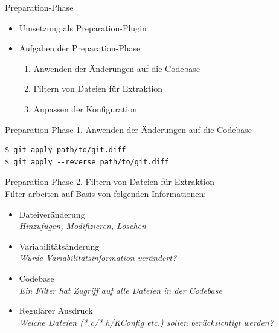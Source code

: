 \documentclass[aspectratio=43, noserifmath]{beamer}
\begin{document}
\begin{frame}{Preparation-Phase}
\begin{itemize}
    \item[\textbullet] Umsetzung als Preparation-Plugin
    \item[\textbullet] Aufgaben der Preparation-Phase \\
    \begin{enumerate}
       \item Anwenden der \"Anderungen auf die Codebase
       \item Filtern von Dateien f\"ur Extraktion
       \item Anpassen der Konfiguration
    \end{enumerate}
\end{itemize}
\end{frame}

\begin{frame}[containsverbatim]{Preparation-Phase}
1. Anwenden der \"Anderungen auf die Codebase

\begin{verbatim}
$ git apply path/to/git.diff
$ git apply --reverse path/to/git.diff
\end{verbatim}

\end{frame}
\begin{frame}[containsverbatim]{Preparation-Phase}
2. Filtern von Dateien f\"ur Extraktion \\
Filter arbeiten auf Basis von folgenden Informationen:
\pause
\begin{itemize}
    \item[\textbullet] Dateiver\"anderung \\ \emph{Hinzuf\"ugen, Modifizieren, L\"oschen}
    \pause
    \item[\textbullet] Variabilit\"ats\"anderung \\ \emph{Wurde Variabilit\"atsinformation ver\"andert?}
    \pause
    \item[\textbullet] Codebase \\ \emph{Ein Filter hat Zugriff auf alle Dateien in der Codebase}
    \pause
    \item[\textbullet] Regul\"arer Ausdruck \\ \emph{Welche Dateien (*.c/*.h/KConfig etc.) sollen ber\"ucksichtigt werden?}
\end{itemize}
\end{frame}
\end{document}
